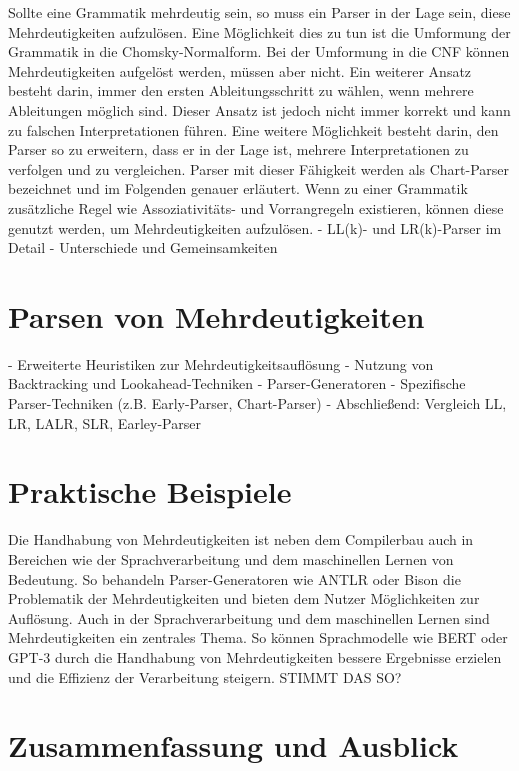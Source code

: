 \documentclass[runningheads]{llncs}
\begin{document}
	Sollte eine Grammatik mehrdeutig sein, so muss ein Parser in der Lage sein, diese Mehrdeutigkeiten aufzulösen.
	Eine Möglichkeit dies zu tun ist die Umformung der Grammatik in die Chomsky-Normalform.
	Bei der Umformung in die CNF können Mehrdeutigkeiten aufgelöst werden, müssen aber nicht.
	Ein weiterer Ansatz besteht darin, immer den ersten Ableitungsschritt zu wählen, wenn mehrere Ableitungen möglich sind.
	Dieser Ansatz ist jedoch nicht immer korrekt und kann zu falschen Interpretationen führen.
	Eine weitere Möglichkeit besteht darin, den Parser so zu erweitern,
	dass er in der Lage ist, mehrere Interpretationen zu verfolgen und zu vergleichen.
	Parser mit dieser Fähigkeit werden als Chart-Parser bezeichnet und im Folgenden genauer erläutert.
	Wenn zu einer Grammatik zusätzliche Regel wie Assoziativitäts- und Vorrangregeln existieren,
	können diese genutzt werden, um Mehrdeutigkeiten aufzulösen. \cite{springer2013}
	- LL(k)- und LR(k)-Parser im Detail
	- Unterschiede und Gemeinsamkeiten


	\section{Parsen von Mehrdeutigkeiten}

	- Erweiterte Heuristiken zur Mehrdeutigkeitsauflösung
	- Nutzung von Backtracking und Lookahead-Techniken
	- Parser-Generatoren
	- Spezifische Parser-Techniken (z.B. Early-Parser, Chart-Parser)
	- Abschließend: Vergleich LL, LR, LALR, SLR, Earley-Parser


	\section{Praktische Beispiele}

	Die Handhabung von Mehrdeutigkeiten ist neben dem Compilerbau
	auch in Bereichen wie der Sprachverarbeitung und dem maschinellen Lernen von Bedeutung.
	So behandeln Parser-Generatoren wie ANTLR oder Bison die Problematik der Mehrdeutigkeiten
	und bieten dem Nutzer Möglichkeiten zur Auflösung.
	Auch in der Sprachverarbeitung und dem maschinellen Lernen sind Mehrdeutigkeiten ein zentrales Thema.
	So können Sprachmodelle wie BERT oder GPT-3 durch die Handhabung von Mehrdeutigkeiten
	bessere Ergebnisse erzielen und die Effizienz der Verarbeitung steigern.
	STIMMT DAS SO?


	\section{Zusammenfassung und Ausblick}
\end{document}
